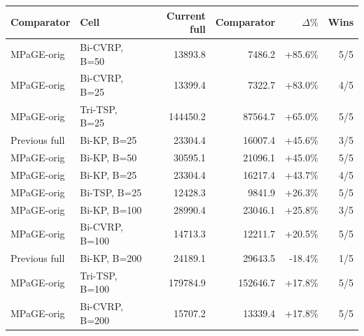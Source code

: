 \begin{tabular}{llrrrr}
\toprule
Comparator & Cell & Current full & Comparator & $\Delta\%$ & Wins \\
\midrule
MPaGE-orig & Bi-CVRP, B=50 & 13893.8 & 7486.2 & +85.6\% & 5/5 \\
MPaGE-orig & Bi-CVRP, B=25 & 13399.4 & 7322.7 & +83.0\% & 4/5 \\
MPaGE-orig & Tri-TSP, B=25 & 144450.2 & 87564.7 & +65.0\% & 5/5 \\
Previous full & Bi-KP, B=25 & 23304.4 & 16007.4 & +45.6\% & 3/5 \\
MPaGE-orig & Bi-KP, B=50 & 30595.1 & 21096.1 & +45.0\% & 5/5 \\
MPaGE-orig & Bi-KP, B=25 & 23304.4 & 16217.4 & +43.7\% & 4/5 \\
MPaGE-orig & Bi-TSP, B=25 & 12428.3 & 9841.9 & +26.3\% & 5/5 \\
MPaGE-orig & Bi-KP, B=100 & 28990.4 & 23046.1 & +25.8\% & 3/5 \\
MPaGE-orig & Bi-CVRP, B=100 & 14713.3 & 12211.7 & +20.5\% & 5/5 \\
Previous full & Bi-KP, B=200 & 24189.1 & 29643.5 & -18.4\% & 1/5 \\
MPaGE-orig & Tri-TSP, B=100 & 179784.9 & 152646.7 & +17.8\% & 5/5 \\
MPaGE-orig & Bi-CVRP, B=200 & 15707.2 & 13339.4 & +17.8\% & 5/5 \\
\bottomrule
\end{tabular}

